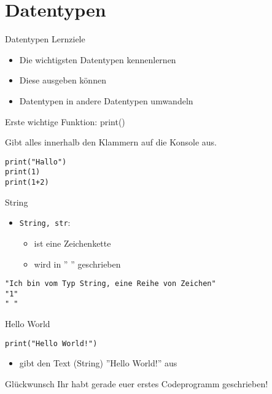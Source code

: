 \section{Datentypen}

\begin{frame}[fragile]{Datentypen}
Lernziele
\begin{itemize}
	\item Die wichtigsten Datentypen kennenlernen
	\item Diese ausgeben können
	\item Datentypen in andere Datentypen umwandeln
\end{itemize}
\end{frame}

\begin{frame}[fragile]{Erste wichtige Funktion: print()}

	Gibt alles innerhalb den Klammern auf die Konsole aus.

\begin{lstlisting}
print("Hallo")
print(1)
print(1+2)
\end{lstlisting}
\end{frame}



\begin{frame}[fragile]{String}
\begin{itemize}
    \item \texttt{String, str}: 
     	\begin{itemize}
     		\item ist eine Zeichenkette
     		\item wird in '' '' geschrieben
     	\end{itemize}
     \end{itemize}
    \begin{lstlisting}
"Ich bin vom Typ String, eine Reihe von Zeichen"
"1"
" "
    \end{lstlisting}
\end{frame}

\begin{frame}[fragile]{Hello World}
\begin{lstlisting}
print("Hello World!")
\end{lstlisting}
\begin{itemize}
	\item gibt den Text (String) ''Hello World!'' aus
\end{itemize}
\begin{exampleblock}{Glückwunsch}
	Ihr habt gerade euer erstes Codeprogramm geschrieben!
\end{exampleblock}
\end{frame}


